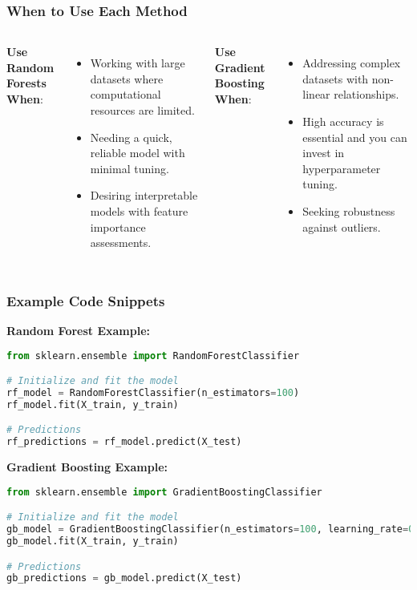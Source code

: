 \documentclass[aspectratio=169]{beamer}
\begin{document}
\begin{frame}
    \frametitle{When to Use Each Method}
    \begin{columns}
        \textbf{Use Random Forests When}:
        \begin{itemize}
            \item Working with large datasets where computational resources are limited.
            \item Needing a quick, reliable model with minimal tuning.
            \item Desiring interpretable models with feature importance assessments.
        \end{itemize}

        \textbf{Use Gradient Boosting When}:
        \begin{itemize}
            \item Addressing complex datasets with non-linear relationships.
            \item High accuracy is essential and you can invest in hyperparameter tuning.
            \item Seeking robustness against outliers.
        \end{itemize}
    \end{columns}
\end{frame}

\begin{frame}[fragile]
    \frametitle{Example Code Snippets}
    \textbf{Random Forest Example:}
    \begin{lstlisting}[language=Python]
from sklearn.ensemble import RandomForestClassifier

# Initialize and fit the model
rf_model = RandomForestClassifier(n_estimators=100)
rf_model.fit(X_train, y_train)

# Predictions
rf_predictions = rf_model.predict(X_test)
    \end{lstlisting}

    \textbf{Gradient Boosting Example:}
    \begin{lstlisting}[language=Python]
from sklearn.ensemble import GradientBoostingClassifier

# Initialize and fit the model
gb_model = GradientBoostingClassifier(n_estimators=100, learning_rate=0.1)
gb_model.fit(X_train, y_train)

# Predictions
gb_predictions = gb_model.predict(X_test)
    \end{lstlisting}
\end{frame}
\end{document}
